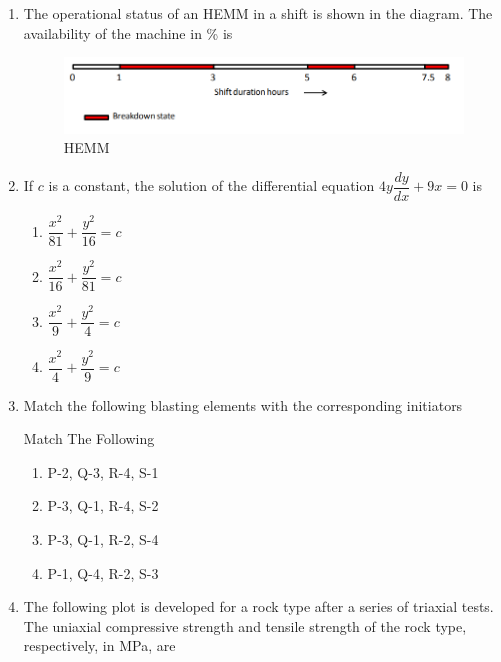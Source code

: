 \documentclass[journal,12pt,onecolumn]{IEEEtran}
\theoremstyle{remark}
\begin{document}
\begin{enumerate}
\item The operational status of an HEMM in a shift is shown in the diagram. The availability of
the machine in \% is
\begin{figure}[H]
  \centering
  \includegraphics[width=0.4\columnwidth]{figs/HEMM.png}
  \caption{HEMM}
  \label{fig:HEMM}
\end{figure}
\hfill{}

\item If $c$ is a constant, the solution of the differential equation $4y\dfrac{dy}{dx}+9x=0$ is  

\hfill{}
\begin{multicols}{4}
\begin{enumerate}
\item $\dfrac{x^2}{81}+\dfrac{y^2}{16}=c$
\item $\dfrac{x^2}{16}+\dfrac{y^2}{81}=c$
\item $\dfrac{x^2}{9}+\dfrac{y^2}{4}=c$ 
\item $\dfrac{x^2}{4}+\dfrac{y^2}{9}=c$
\end{enumerate}
\end{multicols}

\item Match the following blasting elements with the corresponding initiators
\begin{table}[H]
  \centering
  \caption{Match The Following}
  
  \label{tab:Table1}
\end{table}

\hfill{}
\begin{multicols}{4}
\begin{enumerate}
\item P-2, Q-3, R-4, S-1
\item P-3, Q-1, R-4, S-2
\item P-3, Q-1, R-2, S-4 
\item P-1, Q-4, R-2, S-3
\end{enumerate}
\end{multicols}

\item The following plot is developed for a rock type after a series of triaxial tests. The uniaxial
compressive strength and tensile strength of the rock type, respectively, in MPa, are


\end{enumerate}
\end{document}
